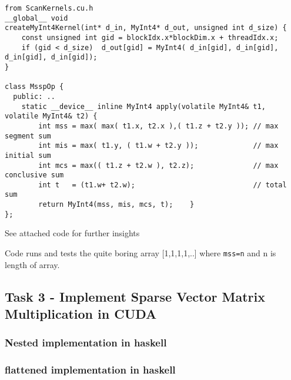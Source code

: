 \documentclass[a4paper,10pt]{article}
\begin{document}
\begin{verbatim}
from ScanKernels.cu.h
__global__ void
createMyInt4Kernel(int* d_in, MyInt4* d_out, unsigned int d_size) {
    const unsigned int gid = blockIdx.x*blockDim.x + threadIdx.x;
    if (gid < d_size)  d_out[gid] = MyInt4( d_in[gid], d_in[gid], d_in[gid], d_in[gid]);
}

class MsspOp {
  public: ..
    static __device__ inline MyInt4 apply(volatile MyInt4& t1, volatile MyInt4& t2) {
        int mss = max( max( t1.x, t2.x ),( t1.z + t2.y )); // max segment sum
        int mis = max( t1.y, ( t1.w + t2.y ));             // max initial sum
        int mcs = max(( t1.z + t2.w ), t2.z);              // max conclusive sum
        int t   = (t1.w+ t2.w);                            // total sum
        return MyInt4(mss, mis, mcs, t);    }     
};
\end{verbatim}
See attached code for further insights

Code runs and tests the quite boring array [1,1,1,1,..] where \texttt{mss=n} and n is length of array.



\subsection{Task 3 - Implement Sparse Vector Matrix Multiplication in CUDA}

\subsubsection{Nested implementation in haskell}

\subsubsection{flattened implementation in haskell}
\end{document}
